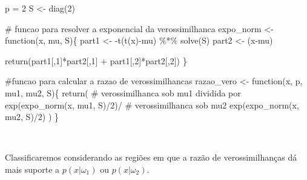 \documentclass[
  a4paperpaper,
]{article}
\newenvironment{Shaded}{\begin{snugshade}}{\end{snugshade}}
\newcommand{\CommentTok}[1]{\textcolor[rgb]{0.37,0.37,0.37}{#1}}
\newcommand{\ControlFlowTok}[1]{\textcolor[rgb]{0.00,0.23,0.31}{#1}}
\newcommand{\DecValTok}[1]{\textcolor[rgb]{0.68,0.00,0.00}{#1}}
\newcommand{\FunctionTok}[1]{\textcolor[rgb]{0.28,0.35,0.67}{#1}}
\newcommand{\NormalTok}[1]{\textcolor[rgb]{0.00,0.23,0.31}{#1}}
\newcommand{\OtherTok}[1]{\textcolor[rgb]{0.00,0.23,0.31}{#1}}
\newcommand{\SpecialCharTok}[1]{\textcolor[rgb]{0.37,0.37,0.37}{#1}}
\begin{document}
\begin{Shaded}
\begin{Highlighting}[]
\NormalTok{p }\OtherTok{=} \DecValTok{2}
\NormalTok{S }\OtherTok{\textless{}{-}} \FunctionTok{diag}\NormalTok{(}\DecValTok{2}\NormalTok{)}

\CommentTok{\# funcao para resolver a exponencial da verossimilhanca}
\NormalTok{expo\_norm }\OtherTok{\textless{}{-}} \ControlFlowTok{function}\NormalTok{(x, mu, S)\{}
\NormalTok{  part1 }\OtherTok{\textless{}{-}} \SpecialCharTok{{-}}\FunctionTok{t}\NormalTok{(}\FunctionTok{t}\NormalTok{(x)}\SpecialCharTok{{-}}\NormalTok{mu) }\SpecialCharTok{\%*\%} \FunctionTok{solve}\NormalTok{(S)}
\NormalTok{  part2 }\OtherTok{\textless{}{-}}\NormalTok{ (x}\SpecialCharTok{{-}}\NormalTok{mu)}
  
  \FunctionTok{return}\NormalTok{(part1[,}\DecValTok{1}\NormalTok{]}\SpecialCharTok{*}\NormalTok{part2[,}\DecValTok{1}\NormalTok{] }\SpecialCharTok{+}\NormalTok{ part1[,}\DecValTok{2}\NormalTok{]}\SpecialCharTok{*}\NormalTok{part2[,}\DecValTok{2}\NormalTok{])}
\NormalTok{\}}

\CommentTok{\#funcao para calcular a razao de verossimilhancas                             }
\NormalTok{razao\_vero }\OtherTok{\textless{}{-}} \ControlFlowTok{function}\NormalTok{(x, p, mu1, mu2, S)\{}
  \FunctionTok{return}\NormalTok{(}
  \CommentTok{\# verossimilhanca sob mu1 dividida por }
   \FunctionTok{exp}\NormalTok{(}\FunctionTok{expo\_norm}\NormalTok{(x, mu1, S)}\SpecialCharTok{/}\DecValTok{2}\NormalTok{)}\SpecialCharTok{/}
    \CommentTok{\# verossimilhanca sob mu2}
   \FunctionTok{exp}\NormalTok{(}\FunctionTok{expo\_norm}\NormalTok{(x, mu2, S)}\SpecialCharTok{/}\DecValTok{2}\NormalTok{)}
\NormalTok{  )}
\NormalTok{\}                             }
\end{Highlighting}
\end{Shaded}

~

Classificaremos considerando as regiões em que a razão de
verossimilhanças dá mais suporte a \(p(x| \omega_1)\) ou
\(p(x| \omega_2)\).
\end{document}
